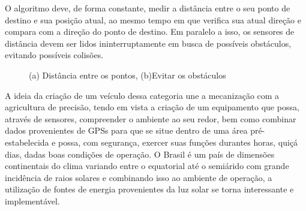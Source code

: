 O algoritmo deve, de forma constante, medir a distância entre o seu ponto de destino e sua posição atual, ao mesmo tempo em que verifica sua atual direção e compara com a direção do ponto de destino. Em paralelo a isso, os sensores de distância devem ser lidos ininterruptamente em busca de possíveis obstáculos, evitando possíveis colisões. 
\begin{figure}[H]
    \begin{center}
    
        
      
    \end{center}
    \caption{%
        (a) Distância entre os pontos, (b)Evitar os obstáculos
     }%
\end{figure}



A ideia da criação de um veículo dessa categoria une a mecanização com a agricultura de precisão, tendo em vista a criação de um equipamento que possa, através de sensores, compreender o ambiente ao seu redor, bem como combinar dados provenientes de GPSs para que se situe dentro de uma área pré-estabelecida e possa, com segurança, exercer suas funções durantes horas, quiçá dias, dadas boas condições de operação. O Brasil é um país de dimensões continentais do clima variando entre o equatorial até o semiárido com grande incidência de raios solares e combinando isso ao ambiente de operação, a utilização de fontes de energia provenientes da luz solar se torna interessante e implementável.


